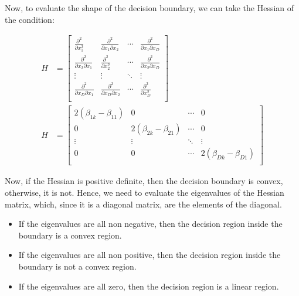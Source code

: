 \documentclass[12pt,a4paper,oneside]{paper}
\begin{document}
Now, to evaluate the shape of the decision boundary, we can take the Hessian of the condition:

\begin{align*}
    H &= \begin{bmatrix}
        \frac{\partial^2}{\partial x_1^2} & \frac{\partial^2}{\partial x_1 \partial x_2} & \cdots & \frac{\partial^2}{\partial x_1 \partial x_D} \\
        \frac{\partial^2}{\partial x_2 \partial x_1} & \frac{\partial^2}{\partial x_2^2} & \cdots & \frac{\partial^2}{\partial x_2 \partial x_D} \\
        \vdots & \vdots & \ddots & \vdots \\
        \frac{\partial^2}{\partial x_D \partial x_1} & \frac{\partial^2}{\partial x_D \partial x_2} & \cdots & \frac{\partial^2}{\partial x_D^2} \\
    \end{bmatrix} \\
    H &= \begin{bmatrix}
        2 (\beta_{1k} - \beta_{11}) & 0 & \cdots & 0 \\
        0 & 2 (\beta_{2k} - \beta_{21}) & \cdots & 0 \\
        \vdots & \vdots & \ddots & \vdots \\
        0 & 0 & \cdots & 2 (\beta_{Dk} - \beta_{D1}) \\
    \end{bmatrix}
\end{align*}

Now, if the Hessian is positive definite, then the decision boundary is convex, otherwise, it is not. 
Hence, we need to evaluate the eigenvalues of the Hessian matrix, which, since it is a diagonal matrix, are the elements of the diagonal.

\begin{itemize}
    \setlength{\itemsep}{0pt} %
    \setlength{\parskip}{0pt} %
    \setlength{\leftskip}{15pt} %
    \item If the eigenvalues are all non negative, then the decision region inside the boundary is a convex region. 
    \item If the eigenvalues are all non positive, then the decision region inside the boundary is not a convex region.
    \item If the eigenvalues are all zero, then the decision region is a linear region.
\end{itemize}
\end{document}
